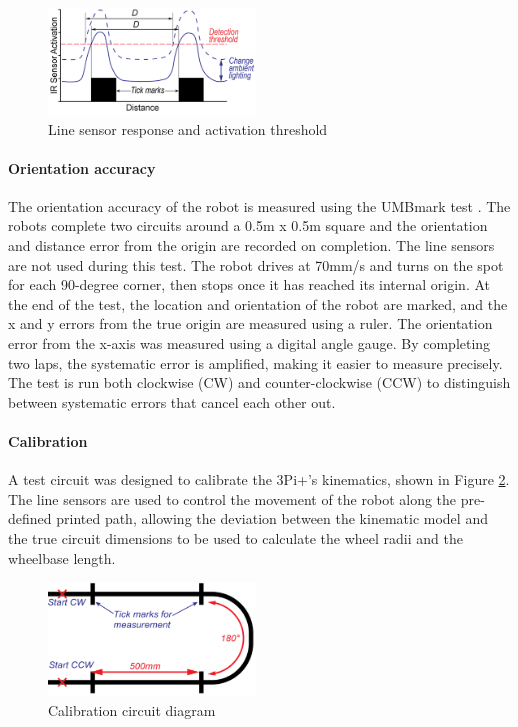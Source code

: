 \documentclass[conference]{IEEEtran}
\begin{document}
\begin{figure}[h!]
    \centering
    \includegraphics[width = 0.49\textwidth]{img/linesensor_response.png}
    \caption{Line sensor response and activation threshold}
    \label{fig:linesensor}
\end{figure}

\paragraph{Orientation accuracy}
The orientation accuracy of the robot is measured using the UMBmark test \cite{UMBmark}. 
The robots complete two circuits around a 0.5m x 0.5m square and the orientation and distance error from the origin are recorded on completion.
The line sensors are not used during this test. The robot drives at 70mm/s and turns on the spot for each 90-degree corner, then stops once it has reached its internal origin.
At the end of the test, the location and orientation of the robot are marked, and the x and y errors from the true origin are measured using a ruler.
The orientation error from the x-axis was measured using a digital angle gauge.
By completing two laps, the systematic error is amplified, making it easier to measure precisely. 
The test is run both clockwise (CW) and counter-clockwise (CCW) to distinguish between systematic errors that cancel each other out.

\paragraph{Calibration}
A test circuit was designed to calibrate the 3Pi+’s kinematics, shown in Figure \ref{fig:calibration_circuit}. 
The line sensors are used to control the movement of the robot along the pre-defined printed path, allowing the deviation between the kinematic model and the true circuit dimensions to be used to calculate the wheel radii and the wheelbase length.

\begin{figure}[h!]
    \centering
    \includegraphics[width = 0.49\textwidth]{img/calibration_circuit.png}
    \caption{Calibration circuit diagram}
    \label{fig:calibration_circuit}
\end{figure}
\end{document}
